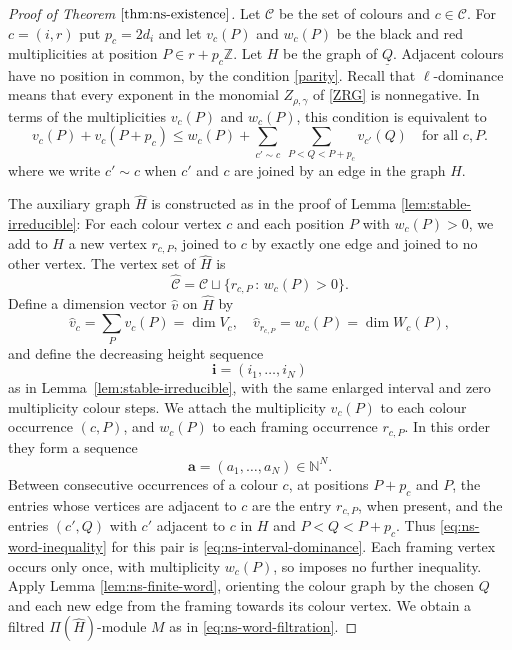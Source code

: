 \documentclass[11pt,reqno]{amsart}
\theoremstyle{definition}
\theoremstyle{remark}
\def\bbZ{\mathbb Z}
\def\dQ{\underline Q}
\begin{document}
\begin{proof}[Proof of Theorem $\ref{thm:ns-existence}$]
\hfill


Let $\mathscr C$ be the set of colours and $c\in\mathscr C$. 
For $c=(i,r)$ put $p_c=2d_i$
and let $v_c(P)$ and $w_c(P)$ be the black and red multiplicities at
position $P\in r+p_c\bbZ$. Let $H$ be the graph of $\dQ$.
Adjacent colours have no position in common,
by the condition \eqref{parity}.
Recall that $\ell$-dominance means that every exponent in the monomial 
$Z_{\rho,\gamma}$ of \eqref{ZRG} is nonnegative. 
In terms of the multiplicities $v_c(P)$ and $w_c(P)$, this condition is equivalent to
\begin{equation}\label{eq:ns-interval-dominance}
v_c(P)+v_c(P+p_c)
\leqslant w_c(P)+\sum_{c'\sim c}\ \sum_{P<Q<P+p_c}v_{c'}(Q)
\quad\text{for all $c,P$.}
\end{equation}
where we write $c'\sim c$ when $c'$ and $c$ are joined by an edge in the graph $H$.

The auxiliary graph $\widehat H$ is constructed as in the proof of Lemma \ref{lem:stable-irreducible}:
For each colour vertex $c$ and each position $P$ with $w_c(P)>0$,
we add to $H$ a new vertex $r_{c,P}$, joined to $c$ by exactly one edge and
joined to no other vertex. The vertex set of $\widehat H$ is
\[
\widehat{\mathscr C}=\mathscr C\sqcup
\{r_{c,P}\,:\,w_c(P)>0\}.
\]
Define a dimension vector $\widehat v$ on $\widehat H$ by
\[
\widehat v_c=\sum_P v_c(P)=\dim V_c,\quad
\widehat v_{r_{c,P}}=w_c(P)=\dim W_c(P),
\]
and define the decreasing height sequence
$$\mathbf i=(i_1,\ldots,i_N)$$ as in Lemma~\ref{lem:stable-irreducible},
with the same enlarged interval and zero multiplicity colour steps.
We attach the multiplicity $v_c(P)$ to each colour occurrence $(c,P)$,
and $w_c(P)$ to each framing occurrence $r_{c,P}$.
In this order they form a sequence 
$$\mathbf a=(a_1,\ldots,a_N)\in\mathbb N^N.$$
Between consecutive occurrences of a colour $c$, at positions $P+p_c$
and $P$, the entries whose vertices are adjacent to $c$ are the entry $r_{c,P}$,
when present, and the entries $(c',Q)$ with $c'$ adjacent to $c$ in $H$ and
$P<Q<P+p_c$. Thus
\eqref{eq:ns-word-inequality} for this pair is
\eqref{eq:ns-interval-dominance}. Each framing vertex occurs only once, with multiplicity $w_c(P)$,
so imposes no further inequality.
Apply Lemma \ref{lem:ns-finite-word}, orienting the colour graph by the
chosen $Q$ and each new edge from the framing towards its colour vertex. 
We obtain a filtred $\Pi(\widehat H)$-module $M$ as in
\eqref{eq:ns-word-filtration}.


\end{proof}
\end{document}
